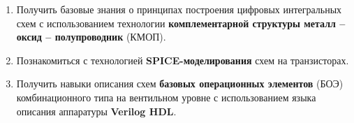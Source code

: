 \begin{enumerate}
	\item Получить базовые знания о принципах построения цифровых интегральных схем с использованием технологии \textbf{комплементарной структуры металл -- оксид -- полупроводник} (КМОП).
	\item Познакомиться с технологией \textbf{SPICE-моделирования} схем на транзисторах.
	\item Получить навыки описания схем \textbf{базовых операционных элементов} (БОЭ) комбинационного типа на вентильном уровне с использованием языка описания аппаратуры \textbf{Verilog HDL}.
\end{enumerate}
